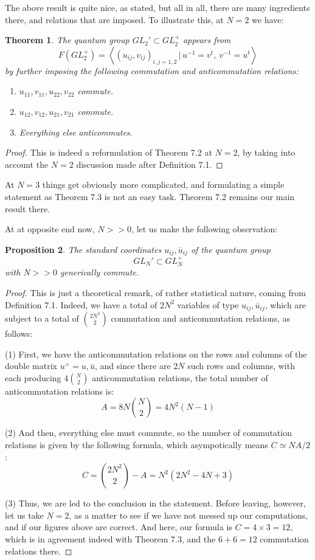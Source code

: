 \documentclass[12pt]{amsbook}
\newtheorem{theorem}{Theorem}[chapter]
\newtheorem{proposition}[theorem]{Proposition}
\begin{document}
The above result is quite nice, as stated, but all in all, there are many ingredients there, and relations that are imposed. To illustrate this, at $N=2$ we have:

\begin{theorem}
The quantum group $GL_2'\subset GL_2^+$ appears from
$$F(GL_2^+)=\left<(u_{ij},v_{ij})_{i,j=1,2}\,\Big|\,u^{-1}=v^t,\ v^{-1}=u^t\right>$$
by further imposing the following commutation and anticommutation relations:
\begin{enumerate}
\item $u_{11},v_{11},u_{22},v_{22}$ commute.

\item $u_{12},v_{12},u_{21},v_{21}$ commute.

\item Everything else anticommutes.
\end{enumerate}
\end{theorem}

\begin{proof}
This is indeed a reformulation of Theorem 7.2 at $N=2$, by taking into account the $N=2$ discussion made after Definition 7.1.
\end{proof}

At $N=3$ things get obviously more complicated, and formulating a simple statement as Theorem 7.3 is not an easy task. Theorem 7.2 remains our main result there.

\bigskip

At at opposite end now, $N>>0$, let us make the following observation:

\begin{proposition}
The standard coordinates $u_{ij},\bar{u}_{ij}$ of the quantum group 
$$GL_N'\subset GL_N^+$$
with $N>>0$ generically commute.
\end{proposition}

\begin{proof}
This is just a theoretical remark, of rather statistical nature, coming from Definition 7.1. Indeed, we have a total of $2N^2$ variables of type $u_{ij},\bar{u}_{ij}$, which are subject to a total of $\binom{2N^2}{2}$ commutation and anticommutation relations, as follows:

\medskip

(1) First, we have the anticommutation relations on the rows and columns of the double matrix $u^\times=u,\bar{u}$, and since there are $2N$ such rows and columns, with each producing $4\binom{N}{2}$ anticommutation relations, the total number of anticommutation relations is:
$$A=8N\binom{N}{2}=4N^2(N-1)$$

(2) And then, everything else must commute, so the number of commutation relations is given by the following formula, which asympotically means $C\simeq NA/2$:
$$C=\binom{2N^2}{2}-A=N^2(2N^2-4N+3)$$

(3) Thus, we are led to the conclusion in the statement. Before leaving, however, let us take $N=2$, as a matter to see if we have not messed up our computations, and if our figures above are correct. And here, our formula is $C=4\times 3=12$, which is in agreement indeed with Theorem 7.3, and the $6+6=12$ commutation relations there.
\end{proof}
\end{document}
